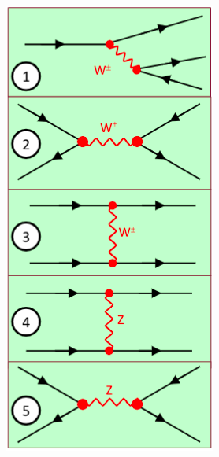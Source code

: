 \begin{minipage}{0.30\textwidth}
\begin{figure}[H]
    \centering
    \includegraphics[width=\textwidth]{immagini/fig_xchange_bosons.png}
\end{figure}
\end{minipage}
